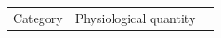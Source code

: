 \begin{table}[t]%
\centering
\begin{footnotesize}
\begin{tabular}{lll}
Category &  Physiological quantity \\

\end{tabular}
\end{footnotesize}
\end{table}
